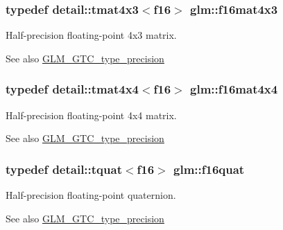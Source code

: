 \subsubsection[{f16mat4x3}]{\setlength{\rightskip}{0pt plus 5cm}typedef detail\+::tmat4x3$<$f16$>$ {\bf glm\+::f16mat4x3}}\label{group__gtc__type__precision_gaa0c9c69c19bf90bb73e455a1e61f7114}
Half-\/precision floating-\/point 4x3 matrix. \begin{DoxySeeAlso}{See also}
\hyperlink{group__gtc__type__precision}{G\+L\+M\+\_\+\+G\+T\+C\+\_\+type\+\_\+precision} 
\end{DoxySeeAlso}
\hypertarget{group__gtc__type__precision_gaf9b9286a90e95701746631e00c08697a}{}
\subsubsection[{f16mat4x4}]{\setlength{\rightskip}{0pt plus 5cm}typedef detail\+::tmat4x4$<$f16$>$ {\bf glm\+::f16mat4x4}}\label{group__gtc__type__precision_gaf9b9286a90e95701746631e00c08697a}
Half-\/precision floating-\/point 4x4 matrix. \begin{DoxySeeAlso}{See also}
\hyperlink{group__gtc__type__precision}{G\+L\+M\+\_\+\+G\+T\+C\+\_\+type\+\_\+precision} 
\end{DoxySeeAlso}
\hypertarget{group__gtc__type__precision_gaf88b8ffe0545265127f072a73725337f}{}
\subsubsection[{f16quat}]{\setlength{\rightskip}{0pt plus 5cm}typedef detail\+::tquat$<$f16$>$ {\bf glm\+::f16quat}}\label{group__gtc__type__precision_gaf88b8ffe0545265127f072a73725337f}
Half-\/precision floating-\/point quaternion. \begin{DoxySeeAlso}{See also}
\hyperlink{group__gtc__type__precision}{G\+L\+M\+\_\+\+G\+T\+C\+\_\+type\+\_\+precision} 
\end{DoxySeeAlso}
\hypertarget{group__gtc__type__precision_ga56f4754172a1f0fb186d95e865106f5a}{}
